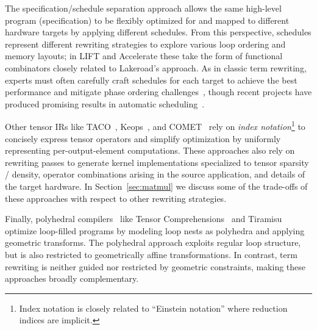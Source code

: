 \documentclass[prologue, dvipsnames, sigplan, screen, review, anonymous]{acmart}
\newcommand{\g}{Lakeroad\xspace}
\begin{document}
The specification/schedule separation approach
  allows the same high-level program (specification)
  to be flexibly optimized for and mapped to
  different hardware targets by applying different schedules.
From this perspective,
  schedules represent different rewriting strategies
  to explore various loop ordering and memory layouts;
  in LIFT and Accelerate these
  take the form of functional combinators
  closely related to \g's approach.
As in classic term rewriting,
  experts must often carefully craft
  schedules for each target to achieve
  the best performance and mitigate
  phase ordering challenges~\cite{phase-ordering},
  though recent projects have produced promising results
  in automatic scheduling~\cite{
    chen2018autotvm, zheng2020ansor, anderson2020learning}.

Other tensor IRs like
  TACO~\cite{taco}, Keops~\cite{keops},
  and COMET~\cite{tian2021highperformance}
  rely on \textit{index notation}\footnote{
    Index notation is closely related to
    ``Einstein notation'' where reduction
    indices are implicit.}
  to concisely express tensor operators
  and simplify optimization by
  uniformly representing
  per-output-element computations.
These approaches also rely on
  rewriting passes to generate
  kernel implementations specialized to
  tensor sparsity / density,
  operator combinations arising in
  the source application, and
  details of the target hardware.
In Section~\ref{sec:matmul} we discuss
  some of the trade-offs of these approaches
  with respect to other rewriting strategies.
 
Finally, polyhedral compilers~\cite{polyhedral-survey}
  like Tensor Comprehensions~\cite{vasilache2018tensor}
  and Tiramisu~\cite{tiramisu}
  optimize loop-filled programs
  by modeling loop nests as polyhedra
  and applying geometric transforms.
The polyhedral approach exploits
  regular loop structure,
  but is also restricted
  to geometrically affine transformations.
In contrast, term rewriting is
  neither guided nor restricted by
  geometric constraints, making
  these approaches broadly complementary.


\end{document}
